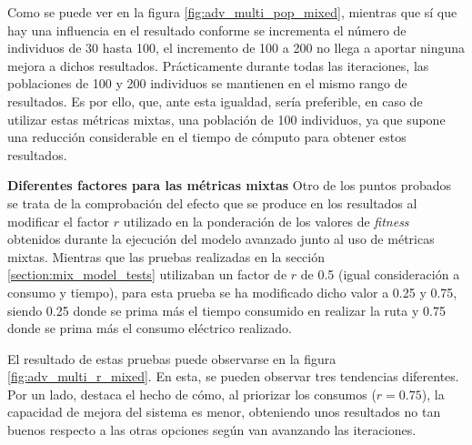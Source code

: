 \documentclass[11pt,spanish,listoffigures,listoftables]{tfgetsinf}
\begin{document}
Como se puede ver en la figura \ref{fig:adv_multi_pop_mixed}, mientras que sí que hay una influencia en el resultado conforme se incrementa el número de individuos de 30 hasta 100, el incremento de 100 a 200 no llega a aportar ninguna mejora a dichos resultados. Prácticamente durante todas las iteraciones, las poblaciones de 100 y 200 individuos se mantienen en el mismo rango de resultados. Es por ello, que, ante esta igualdad, sería preferible, en caso de utilizar estas métricas mixtas, una población de 100 individuos, ya que supone una reducción considerable en el tiempo de cómputo para obtener estos resultados.\newline

\textbf{Diferentes factores para las métricas mixtas}\newline
Otro de los puntos probados se trata de la comprobación del efecto que se produce en los resultados al modificar el factor $r$ utilizado en la ponderación de los valores de \textit{fitness} obtenidos durante la ejecución del modelo avanzado junto al uso de métricas mixtas. Mientras que las pruebas realizadas en la sección \ref{section:mix_model_tests} utilizaban un factor de $r$ de 0.5 (igual consideración a consumo y tiempo), para esta prueba se ha modificado dicho valor a 0.25 y 0.75, siendo 0.25 donde se prima más el tiempo consumido en realizar la ruta y 0.75 donde se prima más el consumo eléctrico realizado.

El resultado de estas pruebas puede observarse en la figura \ref{fig:adv_multi_r_mixed}. En esta, se pueden observar tres tendencias diferentes. Por un lado, destaca el hecho de cómo, al priorizar los consumos ($r=0.75$), la capacidad de mejora del sistema es menor, obteniendo unos resultados no tan buenos respecto a las otras opciones según van avanzando las iteraciones.
\end{document}
